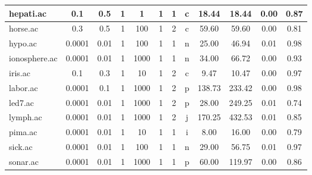 \begin{table}[htbp]
\begin{tabular}{|l|c|c|c|c|c|c|c||c|c|c|c|}
		\hline
		hepati.ac      & 0.1      & 0.5         & 1              & 1                   & 1             & 1      & c             & 18.44          & 18.44          & 0.00           & 0.87           \\
		\hline
		horse.ac       & 0.3      & 0.5         & 1              & 100                 & 1             & 2      & c             & 59.60          & 59.60          & 0.00           & 0.81           \\
		\hline
		hypo.ac        & 0.0001   & 0.01        & 1              & 100                 & 1             & 1      & n             & 25.00          & 46.94          & 0.01           & 0.98           \\
		\hline
		ionosphere.ac  & 0.0001   & 0.01        & 1              & 1000                & 1             & 1      & n             & 34.00          & 66.72          & 0.00           & 0.93           \\
		\hline
		iris.ac        & 0.1      & 0.3         & 1              & 10                  & 1             & 2      & c             & 9.47           & 10.47          & 0.00           & 0.97           \\
		\hline
		labor.ac       & 0.0001   & 0.1         & 1              & 1000                & 1             & 2      & p             & 138.73         & 233.42         & 0.00           & 0.98           \\
		\hline
		led7.ac        & 0.0001   & 0.01        & 1              & 1000                & 1             & 2      & p             & 28.00          & 249.25         & 0.01           & 0.74           \\
		\hline
		lymph.ac       & 0.0001   & 0.01        & 1              & 1000                & 1             & 2      & j             & 170.25         & 432.53         & 0.01           & 0.85           \\
		\hline
		pima.ac        & 0.0001   & 0.01        & 1              & 10                  & 1             & 1      & i             & 8.00           & 16.00          & 0.00           & 0.79           \\
		\hline
		sick.ac        & 0.0001   & 0.01        & 1              & 100                 & 1             & 1      & n             & 29.00          & 56.75          & 0.01           & 0.97           \\
		\hline
		sonar.ac       & 0.0001   & 0.01        & 1              & 1000                & 1             & 1      & p             & 60.00          & 119.97         & 0.00           & 0.86           \\

\end{tabular}
\end{table}
